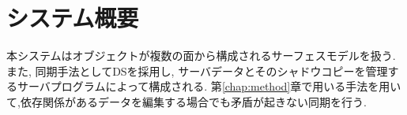 \chapter{システム概要}
本システムはオブジェクトが複数の面から構成されるサーフェスモデルを扱う. また, 同期手法としてDSを採用し, サーバデータとそのシャドウコピーを管理するサーバプログラムによって構成される.
第\ref{chap:method}章で用いる手法を用いて,依存関係があるデータを編集する場合でも矛盾が起きない同期を行う.  
